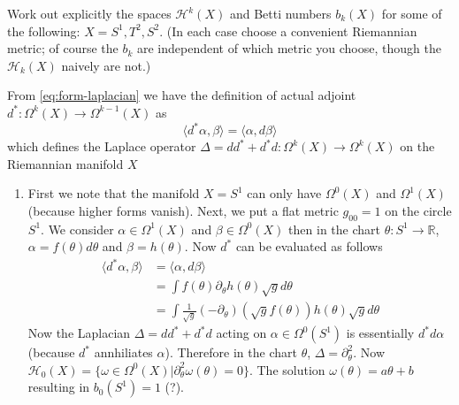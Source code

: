 \documentclass[12pt,letterpaper,reqno]{article}
\numberwithin{equation}{section}
\newcommand{\cH}{\ensuremath{\mathcal H}}
\begin{document}
\begin{exercise} Work out explicitly the spaces $\cH^k(X)$ and
Betti numbers $b_k(X)$ for some of the following: $X = S^1, T^2, S^2$.
(In each case choose a convenient Riemannian metric; of course the $b_k$
are independent of which metric you choose, though the $\cH_k(X)$
naively are not.)
\end{exercise}
\begin{solution}
From \eqref{eq:form-laplacian} we have the definition of actual adjoint $d^*:\Omega^k(X)\to\Omega^{k-1}(X)$ as
\begin{equation}
  \langle d^*\alpha,\beta\rangle=\langle\alpha,d\beta\rangle
\end{equation}
which defines the Laplace operator $\Delta=dd^*+d^*d:\Omega^k(X)\to\Omega^k(X)$ on the Riemannian manifold $X$
\begin{enumerate}
\item First we note that the manifold $X=S^1$ can only have $\Omega^0(X)$ and $\Omega^1(X)$ (because higher forms vanish). Next, we put a flat metric $g_{00}=1$ on the circle $S^1$.  We consider $\alpha\in\Omega^1(X)$ and $\beta\in\Omega^0(X)$ then in the chart $\theta:S^1\to\mathbb{R}$, $\alpha = f(\theta)d\theta$ and $\beta=h(\theta)$.  Now $d^*$ can be evaluated as follows
  \begin{equation}
    \begin{split}
       \langle d^*\alpha,\beta\rangle&=\langle\alpha,d\beta\rangle\\   
       &=\int f(\theta)\partial_\theta h(\theta)\sqrt{g}d\theta\\
       &=\int\frac{1}{\sqrt{g}}(-\partial_\theta)(\sqrt{g} f(\theta))h(\theta)\sqrt{g}d\theta
    \end{split}
  \end{equation}
Now the Laplacian $\Delta=dd^*+d^*d$ acting on $\alpha\in\Omega^0(S^1)$ is essentially $d^*d\alpha$ (because $d^*$ annhiliates $\alpha$).  Therefore in the chart $\theta$, $\Delta=\partial^2_\theta$.  Now $\mathcal{H}_0(X)=\{\omega\in\Omega^0(X)|\partial^2_\theta\omega(\theta)=0\}$.  The solution $\omega(\theta)=a\theta+b$ resulting in $b_0(S^1)=1$ (?).


\end{enumerate}
\end{solution}
\end{document}
